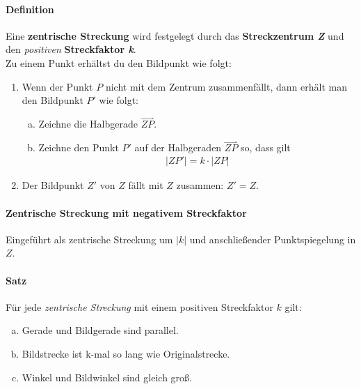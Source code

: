 \documentclass[a4paper,headlines=4, footlines=1]{scrartcl}
\newcommand{\ray}[1]{\stackrel{\rightharpoonup}{#1}}
\begin{document}
\paragraph{Definition}
Eine \textbf{zentrische Streckung} wird festgelegt durch das \textbf{Streckzentrum \textit{Z}} und den \textit{positiven} \textbf{Streckfaktor \textit{k}}.\\
Zu einem Punkt erhältst du den Bildpunkt wie folgt:
\begin{enumerate}[(1)]
	\item Wenn der Punkt $ P $ nicht mit dem Zentrum zusammenfällt, dann erhält man den Bildpunkt $ P' $ wie folgt:
	\begin{enumerate}[(a)]
		\item Zeichne die Halbgerade $ \ray{ZP} $.
		\item Zeichne den Punkt $ P' $ auf der Halbgeraden $ \ray{ZP} $ so, dass gilt
		\begin{align*}
		\left|ZP'\right| = k \cdot \left|ZP\right|
		\end{align*}
	\end{enumerate}
	\item Der Bildpunkt $ Z' $ von $ Z $ fällt mit $ Z $ zusammen: $ Z' = Z $.
\end{enumerate}
\paragraph{Zentrische Streckung mit negativem Streckfaktor}
Eingeführt als zentrische Streckung um $ \left|k\right| $ und anschließender Punktspiegelung in $ Z $.
\paragraph{Satz}
Für jede \textit{zentrische Streckung} mit einem positiven Streckfaktor $ k $ gilt:
\begin{enumerate}[(a)]
	\item Gerade und Bildgerade sind parallel.
	\item Bildstrecke ist k-mal so lang wie Originalstrecke.
	\item Winkel und Bildwinkel sind gleich groß.
\end{enumerate}
\end{document}
